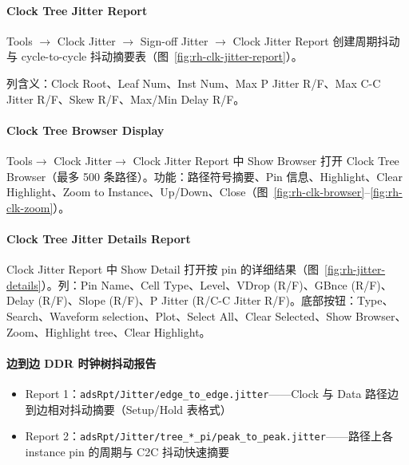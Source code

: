 \paragraph{Clock Tree Jitter Report}
Tools $\rightarrow$ Clock Jitter $\rightarrow$ Sign-off Jitter $\rightarrow$ Clock Jitter Report 创建周期抖动与 cycle-to-cycle 抖动摘要表（图~\ref{fig:rh-clk-jitter-report}）。

列含义：Clock Root、Leaf Num、Inst Num、Max P Jitter R/F、Max C-C Jitter R/F、Skew R/F、Max/Min Delay R/F。


\paragraph{Clock Tree Browser Display}
Tools$\rightarrow$ Clock Jitter$\rightarrow$ Clock Jitter Report 中 Show Browser 打开 Clock Tree Browser（最多 500 条路径）。功能：路径符号摘要、Pin 信息、Highlight、Clear Highlight、Zoom to Instance、Up/Down、Close（图~\ref{fig:rh-clk-browser}--\ref{fig:rh-clk-zoom}）。




\paragraph{Clock Tree Jitter Details Report}
Clock Jitter Report 中 Show Detail 打开按 pin 的详细结果（图~\ref{fig:rh-jitter-details}）。列：Pin Name、Cell Type、Level、VDrop (R/F)、GBnce (R/F)、Delay (R/F)、Slope (R/F)、P Jitter (R/C-C Jitter R/F)。底部按钮：Type、Search、Waveform selection、Plot、Select All、Clear Selected、Show Browser、Zoom、Highlight tree、Clear Highlight。


\paragraph{边到边 DDR 时钟树抖动报告}
\begin{itemize}
  \item Report 1：\texttt{adsRpt/Jitter/edge\_to\_edge.jitter}——Clock 与 Data 路径边到边相对抖动摘要（Setup/Hold 表格式）
  \item Report 2：\texttt{adsRpt/Jitter/tree\_*\_pi/peak\_to\_peak.jitter}——路径上各 instance pin 的周期与 C2C 抖动快速摘要
\end{itemize}

